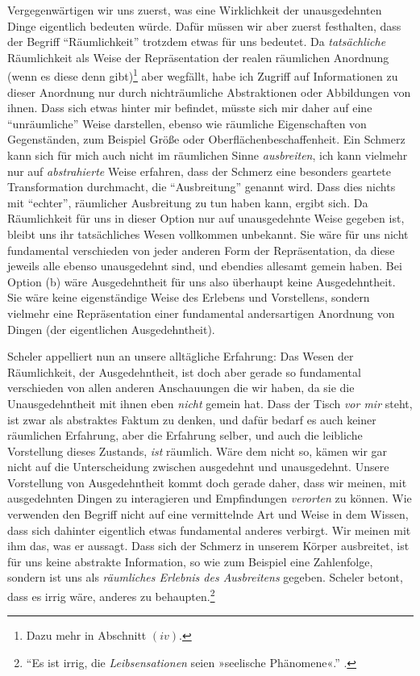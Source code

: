 \documentclass[a4paper, 12pt]{article}
\begin{document}
\begin{onehalfspace}

Vergegenwärtigen wir uns zuerst, was eine Wirklichkeit der unausgedehnten Dinge eigentlich bedeuten würde. Dafür müssen wir aber zuerst festhalten, dass der Begriff "`Räumlichkeit"' trotzdem etwas für uns bedeutet. Da \emph{tatsächliche} Räumlichkeit als Weise der Repräsentation der realen räumlichen Anordnung (wenn es diese denn gibt)\footnote{Dazu mehr in Abschnitt $(iv)$.} aber wegfällt, habe ich Zugriff auf Informationen zu dieser Anordnung nur durch nichträumliche Abstraktionen oder Abbildungen von ihnen. Dass sich etwas hinter mir befindet, müsste sich mir daher auf eine "`unräumliche"' Weise darstellen, ebenso wie räumliche Eigenschaften von Gegenständen, zum Beispiel Größe oder Oberflächen\-be\-schaf\-fenheit. Ein Schmerz kann sich für mich auch nicht im räumlichen Sinne \emph{ausbreiten}, ich kann vielmehr nur auf \emph{abstrahierte} Weise erfahren, dass der Schmerz eine besonders geartete Transformation durchmacht, die "`Ausbreitung"' genannt wird. Dass dies nichts mit "`echter"', räumlicher Ausbreitung zu tun haben kann, ergibt sich. Da Räumlichkeit für uns in dieser Option nur auf unausgedehnte Weise gegeben ist, bleibt uns ihr tatsächliches Wesen vollkommen unbekannt. Sie wäre für uns nicht fundamental verschieden von jeder anderen Form der Repräsentation, da diese jeweils alle ebenso unausgedehnt sind, und ebendies allesamt gemein haben. Bei Option (b) wäre Ausgedehntheit für uns also überhaupt keine Ausgedehntheit. Sie wäre keine eigenständige Weise des Erlebens und Vorstellens, sondern vielmehr eine Repräsentation einer fundamental andersartigen Anordnung von Dingen (der eigentlichen Ausgedehntheit).

Scheler appelliert nun an unsere alltägliche Erfahrung: Das Wesen der Räumlichkeit, der Ausgedehntheit, ist doch aber gerade so fundamental verschieden von allen anderen Anschauungen die wir haben, da sie die Unausgedehntheit mit ihnen eben \emph{nicht} gemein hat. Dass der Tisch \emph{vor mir} steht, ist zwar als abstraktes Faktum zu denken, und dafür bedarf es auch keiner räumlichen Erfahrung, aber die Erfahrung selber, und auch die leibliche Vorstellung dieses Zustands, \emph{ist} räumlich. Wäre dem nicht so, kämen wir gar nicht auf die Unterscheidung zwischen ausgedehnt und unausgedehnt. Unsere Vorstellung von Ausgedehntheit kommt doch gerade daher, dass wir meinen, mit ausgedehnten Dingen zu interagieren und Empfindungen \emph{verorten} zu können. Wie verwenden den Begriff nicht auf eine vermittelnde Art und Weise in dem Wissen, dass sich dahinter eigentlich etwas fundamental anderes verbirgt. Wir meinen mit ihm das, was er aussagt. Dass sich der Schmerz in unserem Körper ausbreitet, ist für uns keine abstrakte Information, so wie zum Beispiel eine Zahlenfolge, sondern ist uns als \emph{räumliches Erlebnis des Ausbreitens} gegeben. Scheler betont, dass es irrig wäre, anderes zu behaupten.\footnote{"`Es ist irrig, die \emph{Leibsensationen} seien »seelische Phänomene«."' .} 


\end{onehalfspace}
\end{document}
